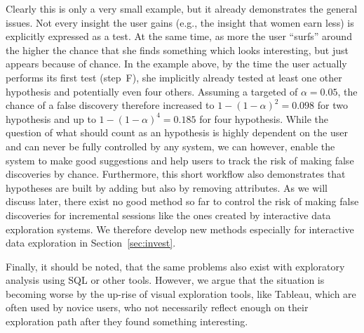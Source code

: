 Clearly this is only a very small example, but it already demonstrates the general issues. 
Not every insight the user gains (e.g., the insight that women earn less) is explicitly expressed as a test. 
At the same time, as more the user ``surfs'' around the higher the chance that she finds something which looks interesting, but just appears because of chance. 
In the example above, by the time the user actually performs its first test (step~F), she implicitly already tested at least one other hypothesis and potentially even four others. 
Assuming a targeted \pval of $\alpha = 0.05$, the chance of a false discovery therefore increased to $1 - (1 - \alpha)^2=0.098$ for two hypothesis and up to $1 - (1 - \alpha)^4=0.185$ for four hypothesis. 
While the question of what should count as an hypothesis is highly dependent on the user and can never be fully controlled by any system, we can however, enable the system to make good suggestions and help users to track the risk of making false discoveries by chance. 
Furthermore, this short workflow also demonstrates that hypotheses are built by adding but also by removing attributes. 
As we will discuss later, there exist no good method so far to control the risk of making false discoveries for incremental sessions like the ones created by interactive data exploration systems. 
We therefore develop new methods especially for interactive data exploration in Section~\ref{sec:invest}.

Finally, it should be noted, that the same problems also exist with exploratory analysis using SQL or other tools. 
However, we argue that the situation is becoming worse by the up-rise of visual exploration tools, like Tableau, which are often used by novice users, who not necessarily reflect enough on their exploration path after they found something interesting. 







